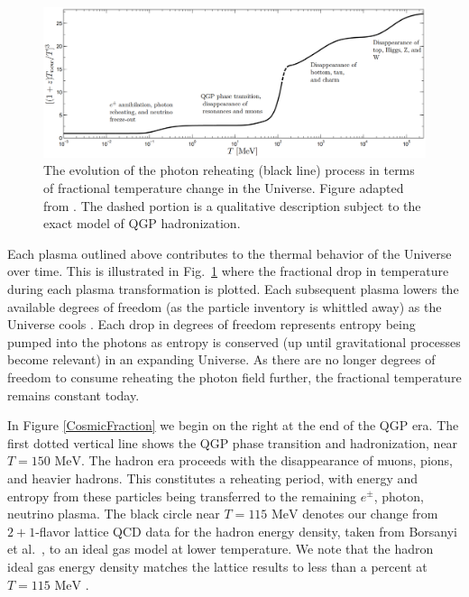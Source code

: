 \documentclass[universe,article,submit,moreauthors,pdftex,a4paper]{Definitions/mdpi}
\newcommand{\MeV}{\text{ MeV}}
\newcommand*{\rf}[1]{Fig.~{\ref{#1}}}
\begin{document}
\begin{figure}[ht]
  \centering
  \includegraphics[width=\textwidth]{./plots/degrees_of_freedom}
  \caption{The evolution of the photon reheating (black line) process in terms of fractional temperature change in the Universe. Figure adapted from \cite{Rafelski:2013yka}. The dashed portion is a qualitative description subject to the exact model of QGP hadronization.}
  \label{degrees_of_freedom} 
\end{figure}

Each plasma outlined above contributes to the thermal behavior of the Universe over time. This is illustrated in \rf{degrees_of_freedom} where the fractional drop in temperature during each plasma transformation is plotted. Each subsequent plasma lowers the available degrees of freedom (as the particle inventory is whittled away) as the Universe cools \cite{Wantz:2009it,Rafelski:2013yka}. Each drop in degrees of freedom represents entropy being pumped into the photons as entropy is conserved (up until gravitational processes become relevant) in an expanding Universe. As there are no longer degrees of freedom to consume reheating the photon field further, the fractional temperature remains constant today.

In Figure \ref{CosmicFraction} we begin on the right at the end  of the QGP era.  The first dotted vertical line shows the QGP phase transition and hadronization, near $T=150\MeV$. The hadron era proceeds with the disappearance of muons, pions, and heavier hadrons. This constitutes a reheating period, with energy and entropy from these particles being transferred to the remaining $e^\pm$, photon, neutrino plasma. The black circle near $T=115\MeV$ denotes our change from $2+1$-flavor lattice QCD \cite{Kronfeld:2012ym, DElia:2012ifm, Bonati:2013hsa} data for the hadron energy density, taken from Borsanyi et al.~\cite{Borsanyi:2012rr,Borsanyi:2013bia}, to an ideal gas model \cite{Bernstein:1988bw} at lower temperature.  We note that the hadron ideal gas energy density matches the lattice results to less than a percent at $T=115\MeV$ \cite{Philipsen:2012nu}. 
\end{document}
